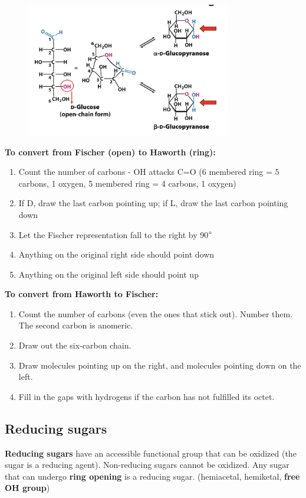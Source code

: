\documentclass[letterpaper, 12pt]{article}
\begin{document}
\begin{figure}[H]
\centering
\includegraphics[width=0.8\textwidth]{projections}
\end{figure}

\textbf{To convert from Fischer (open) to Haworth (ring):}

\begin{enumerate}
\item Count the number of carbons - OH attacks C=O (6 membered ring = 5 carbons, 1 oxygen, 5 membered ring = 4 carbons, 1 oxygen)
\item If D, draw the last carbon pointing up; if L, draw the last carbon pointing down
\item Let the Fischer representation fall to the right by 90$\degree$
\item Anything on the original right side should point down
\item Anything on the original left side should point up
\end{enumerate}

\textbf{To convert from Haworth to Fischer:}

\begin{enumerate}
\item Count the number of carbons (even the ones that stick out). Number them. The second carbon is anomeric.
\item Draw out the six-carbon chain.
\item Draw molecules pointing up on the right, and molecules pointing down on the left.
\item Fill in the gaps with hydrogens if the carbon has not fulfilled its octet.
\end{enumerate}

\subsection*{Reducing sugars}
\textbf{Reducing sugars} have an accessible functional group that can be oxidized (the sugar is a reducing agent). Non-reducing sugars cannot be oxidized. Any sugar that can undergo \textbf{ring opening} is a reducing sugar. (hemiacetal, hemiketal, \textbf{free OH group})
\end{document}
